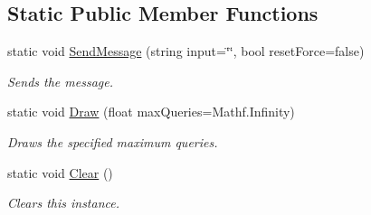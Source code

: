 \subsection*{Static Public Member Functions}
\begin{DoxyCompactItemize}
\item 
static void \hyperlink{class_lerp2_a_p_i_1_1_game_1_1_game_console_ac033b4cf507be1588339059c3c466ea3}{Send\+Message} (string input=\char`\"{}\char`\"{}, bool reset\+Force=false)
\begin{DoxyCompactList}\small\item\em Sends the message. \end{DoxyCompactList}\item 
static void \hyperlink{class_lerp2_a_p_i_1_1_game_1_1_game_console_a1cb8971ac1e38f65234bea0d17429acb}{Draw} (float max\+Queries=Mathf.\+Infinity)
\begin{DoxyCompactList}\small\item\em Draws the specified maximum queries. \end{DoxyCompactList}\item 
static void \hyperlink{class_lerp2_a_p_i_1_1_game_1_1_game_console_acf996b54c85610e97ecc7aa094860e8b}{Clear} ()
\begin{DoxyCompactList}\small\item\em Clears this instance. \end{DoxyCompactList}\end{DoxyCompactItemize}
